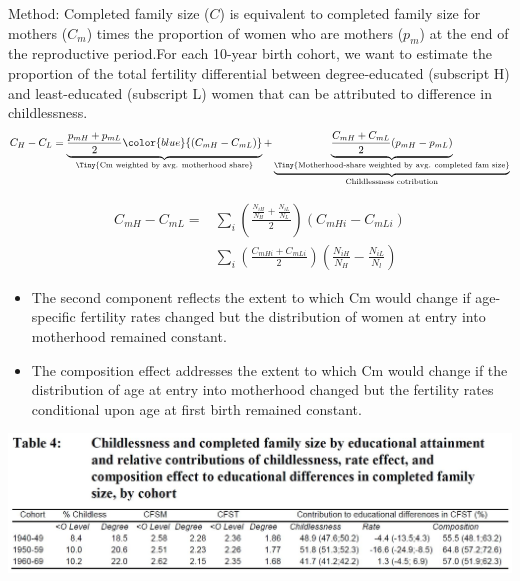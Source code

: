 \documentclass[xcolor={dvipsnames}]{beamer}
\begin{document}
\begin{frame}
Method: Completed family size ($C$) is equivalent to completed family size for mothers ($C_m$) times the proportion of women who are mothers ($p_m$) at the end of the reproductive period.For each 10-year birth cohort, we want to estimate the proportion of the total fertility differential between degree-educated (subscript H) and least-educated (subscript L) women that can be attributed to difference in childlessness.
\hphantom{}
\begin{equation*}
C_H-C_L=  \underbrace{\frac{p_{mH} + p_{mL}}{2}\color{blue}{(C_{mH}-C_{mL})}}_{\text{\Tiny{Cm weighted by avg. motherhood share}}}+
\underbrace{ \underbrace{\frac{ C_{mH}+C_{mL}}{2}(p_{mH} - p_{mL})}_{\text{\Tiny{Motherhood-share weighted by avg. completed fam size}}}}_{\text{Childlessness cotribution}}
\end{equation*}

\end{frame}

\begin{frame}
\[
\begin{aligned}
C_{mH}-C_{mL} = & \sum_i \left( \frac{\frac{N_{iH}}{N_H} + \frac{N_{iL}}{N_L}}{2} \right)(C_{mHi}-C_{mLi}) \\
& \sum_i \left(\frac{C_{mHi}+C_{mLi}}{2} \right)\left(\frac{N_{iH}}{N_H} - \frac{N_{iL}}{N_l} \right)  
\end{aligned}
\]

\pause

\small{
\begin{itemize}
\item  The second component reflects the extent to which Cm would change if age-specific fertility rates changed but the distribution of women at entry into motherhood remained constant.
\item The composition effect addresses the extent to which Cm would change if the distribution of age at entry into motherhood changed but the fertility rates conditional upon age at first birth remained constant.
\end{itemize}

}
\end{frame}





\begin{frame}
\begin{center}
\includegraphics[scale=.25]{Figures/Berrington_results.JPG}
\end{center}

\end{frame}
\end{document}
